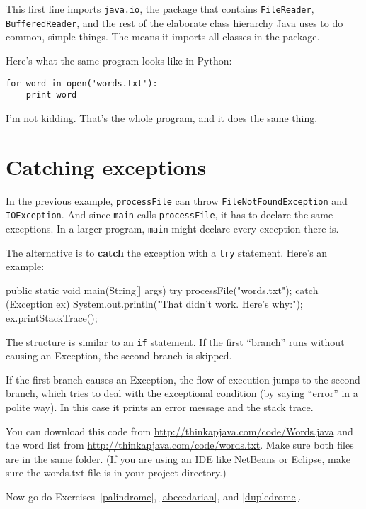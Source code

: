 This first line imports {\tt java.io}, the package that contains
{\tt FileReader}, {\tt BufferedReader}, and the rest of
the elaborate class hierarchy Java uses to do
common, simple things.  The {\tt *} means it imports all classes
in the package.

Here's what the same program looks like in Python:

\begin{verbatim}
for word in open('words.txt'):
    print word
\end{verbatim}

I'm not kidding.  That's the whole program, and it does the same thing.


\section{Catching exceptions}

In the previous example, {\tt processFile} can throw
{\tt FileNotFoundException} and {\tt IOException}.  And since
{\tt main} calls {\tt processFile}, it has to declare the
same exceptions.  In a larger program, {\tt main} might
declare every exception there is.

The alternative is to {\bf catch} the exception with a
{\tt try} statement.  Here's an example:

\begin{code}
    public static void main(String[] args) {
        try {
            processFile("words.txt");
        } catch (Exception ex) {
            System.out.println("That didn't work.  Here's why:");
            ex.printStackTrace();
        }
    }
\end{code}

The structure is similar to an {\tt if} statement.  If the first
``branch'' runs without causing an Exception, the second branch
is skipped.

If the first branch causes an Exception, the flow of execution jumps
to the second branch, which tries to deal with the exceptional
condition (by saying ``error'' in a polite way).  In this case it prints
an error message and the stack trace.

You can download this code from
\url{http://thinkapjava.com/code/Words.java}
and the word list from
\url{http://thinkapjava.com/code/words.txt}.
Make sure both files are in the same folder.
(If you are using an IDE like NetBeans or Eclipse, make
sure the words.txt file is in your project directory.)

Now go do Exercises~\ref{palindrome}, \ref{abecedarian}, and \ref{dupledrome}.



